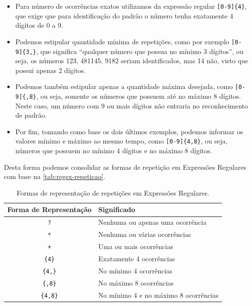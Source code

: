 \begin{itemize}

    \item Para número de ocorrências exatos utilizamos da expressão regular \texttt{[0-9]\{4\}}, que exige que para identificação do padrão o número tenha exatamente 4 dígitos de 0 a 9.

    \item Podemos estipular quantidade mínima de repetições, como por exemplo \texttt{[0-9]\{3,\}}, que significa ``qualquer número que possua no mínimo 3 dígitos'', ou seja, os números 123, 481145, 9182 seriam identificados, mas 14 não, visto que possui apenas 2 dígitos.

    \item Podemos também estipular apenas a quantidade máxima desejada, como \texttt{[0-9]\{,8\}}, ou seja, somente os números que possuem até no máximo 8 dígitos. Neste caso, um número com 9 ou mais dígitos não entraria no reconhecimento de padrão.

    \item Por fim, tomando como base os dois últimos exemplos, podemos informar os valores mínimo e máximo ao mesmo tempo, como \texttt{[0-9]\{4,8\}}, ou seja, números que possuem no mínimo 4 dígitos e no máximo 8 dígitos.

\end{itemize}

Desta forma podemos consolidar as formas de repetição em Expressões Regulares com base na \autoref{tab:regex-repeticao}.

\begin{table}
    \caption{Formas de representação de repetições em Expressões Regulares.}
    \begin{center}
        \begin{tabular}{|c|l|}
            \hline 
            \textbf{Forma de Representação} & \textbf{Significado} \\ 
            \hline 
            \texttt{?} & Nenhuma ou apenas uma ocorrência \\
            \hline 
            \texttt{*} & Nenhuma ou várias ocorrências \\
            \hline
            \texttt{+} & Uma ou mais ocorrências \\
            \hline
            \texttt{\{4\}} & Exatamente 4 ocorrências \\
            \hline
            \texttt{\{4,\}} & No mínimo 4 ocorrências \\
            \hline
            \texttt{\{,8\}} & No máximo 8 ocorrências \\
            \hline
            \texttt{\{4,8\}} & No mínimo 4 e no máximo 8 ocorrências \\
            \hline
        \end{tabular}
    \end{center}
    \label{tab:regex-repeticao}
\end{table}


